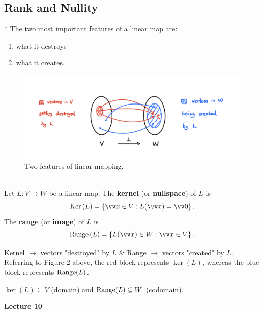 \subsection{Rank and Nullity}

* The two most important features of a linear map are:
\begin{enumerate}
    \item what it destroys
    \item what it creates.
\end{enumerate}
\vspace{-3mm}

\begin{figure}[htbp]
    \center
    \includegraphics[scale=0.23]{img/linear-mapping.jpg}
    \caption{Two features of linear mapping.}
\end{figure}

\begin{definition}
    \phantom{}\\
    Let $L:V\to W$ be a linear map. The \textbf{kernel} (or \textbf{nullspace}) of $L$ is
    \[\ker{(L)} = \left\{\vx \in V: L(\vx) = \vzero\right\}.\]
    The \textbf{range} (or \textbf{image}) of $L$ is
    \[\range{(L)} = \left\{  L(\vx) \in W: \vx \in V \right\}.\]
\end{definition}

\begin{remark}
    Kernel $\to$ vectors "destroyed" by $L$ \quad  \& \quad Range $\to$ vectors "created" by $L$. \\
    Referring to Figure 2 above, the red block represents $\ker(L)$, whereas the blue block represents $\operatorname{Range}(L)$.
\end{remark}

\begin{note}
    $\ker(L) \subseteq V$ (domain) and $\operatorname{Range}(L) \subseteq W$ (codomain).
\end{note}


\makebox[\linewidth]{\hrulefill}
{\large \textbf{Lecture 10}}

